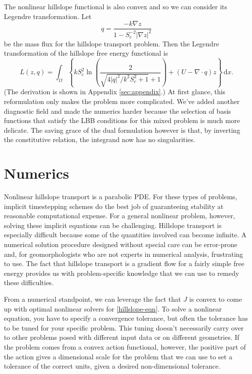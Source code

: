 \documentclass{article}
\theoremstyle{definition}
\theoremstyle{plain}
\newcommand{\ud}{\hspace{2pt}\mathrm{d}}
\begin{document}
The nonlinear hillslope functional is also convex and so we can consider its Legendre transformation.
Let
\begin{equation}
    q = \frac{-k\nabla z}{1 - S_c^{-2}|\nabla z|^2}
\end{equation}
be the mass flux for the hillslope transport problem.
Then the Legendre transformation of the hillslope free energy functional is
\begin{equation}
    L(z, q) = \int_\Omega\left\{kS_c^2\ln\left(\frac{2}{\sqrt{4|q|^2 / k^2S_c^2 + 1} + 1}\right) + (U - \nabla\cdot q)z\right\}\ud x.
\end{equation}
(The derivation is shown in Appendix \ref{sec:appendix}.)
At first glance, this reformulation only makes the problem more complicated.
We've added another diagnostic field and made the numerics harder because the selection of basis functions that satisfy the LBB conditions for this mixed problem is much more delicate.
The saving grace of the dual formulation however is that, by inverting the constitutive relation, the integrand now has no singularities.


\section{Numerics}

Nonlinear hillslope transport is a parabolic PDE.
For these types of problems, implicit timestepping schemes do the best job of guaranteeing stability at reasonable computational expense.
For a general nonlinear problem, however, solving these implicit equations can be challenging.
Hillslope transport is especially difficult because some of the quantities involved can become infinite.
A numerical solution procedure designed without special care can be error-prone and, for geomorphologists who are not experts in numerical analysis, frustrating to use.
The fact that hillslope transport is a gradient flow for a fairly simple free energy provides us with problem-specific knowledge that we can use to remedy these difficulties.

From a numerical standpoint, we can leverage the fact that $J$ is convex to come up with optimal nonlinear solvers for \eqref{hillslope-eqn}.
To solve a nonlinear equation, you have to specify a convergence tolerance, but often the tolerance has to be tuned for your specific problem.
This tuning doesn't necessarily carry over to other problems posed with different input data or on different geometries.
If the problem comes from a convex action functional, however, the positive part of the action gives a dimensional scale for the problem that we can use to set a tolerance of the correct units, given a desired non-dimensional tolerance.
\end{document}
